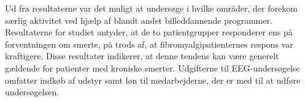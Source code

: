 Ud fra resultaterne var det muligt at undersøge i hvilke områder, der forekom særlig aktivitet ved hjælp af blandt andet billeddannende programmer. Resultaterne for studiet antyder, at de to patientgrupper responderer ens på forventningen om smerte, på trods af, at fibromyalgipatienternes respons var kraftigere. Disse resultater indikerer, at denne tendens kan være generelt gældende for patienter med kroniske smerter. \citep{Brown2013} Udgifterne til EEG-undersøgelse omfatter indkøb af udstyr samt løn til medarbejderne, der er med til at udføre undersøgelsen\citep{Green1985}.  

